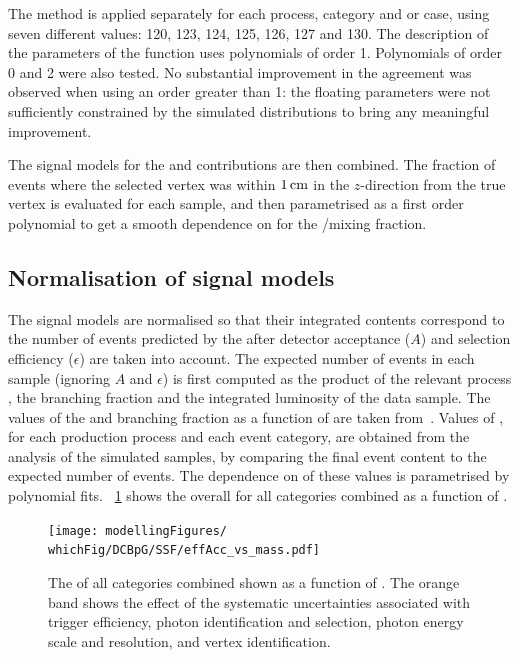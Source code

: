The \SSF method is applied separately for each process, category and \RV or \WV case, using seven different \mH values: 120, 123, 124, 125, 126, 127 and 130\GeV. The description of the parameters of the \DCBpG function uses polynomials of order 1. Polynomials of order 0 and 2 were also tested. No substantial improvement in the agreement was observed when using an order greater than 1: the floating parameters were not sufficiently constrained by the simulated \mgg distributions to bring any meaningful improvement.

The signal models for the \RV and \WV contributions are then combined. %
The fraction of events where the selected vertex was within $1\,\text{cm}$ in the $z$-direction from the true vertex is evaluated for each \mH sample, and then parametrised as a first order polynomial to get a smooth dependence on \mH for the \RV/\WV mixing fraction.


\subsection{Normalisation of signal models}

The signal models are normalised so that their integrated contents correspond to the number of events predicted by the \SM after detector acceptance ($A$) and selection efficiency ($\epsilon$) are taken into account. The expected number of events in each sample (ignoring $A$ and $\epsilon$) is first computed as the product of the relevant process \crosssection, the \Hgg branching fraction and the integrated luminosity of the data sample. The values of the \crosssection\s and branching fraction as a function of \mH are taken from~\cite{LHCHXSWGYR4}. 
Values of \effxacc, for each production process and each event category, are obtained from the analysis of the simulated samples, by comparing the final event content to the expected number of events.
The dependence on \mH of these values is parametrised by polynomial fits.
\Fig~\ref{fig:model:sig_effxacc} shows the overall \effxacc for all categories combined as a function of \mH.

\begin{figure}[ht!]
\centering
\texttt{[image: modellingFigures/\\whichFig/DCBpG/SSF/effAcc\_vs\_mass.pdf]} 
\caption{The \effxacc of all categories combined shown as a function of \mH. The orange band shows the effect of the systematic uncertainties associated with trigger efficiency, photon identification and selection, photon energy scale and resolution, and vertex identification.}

\label{fig:model:sig_effxacc}
\end{figure}


